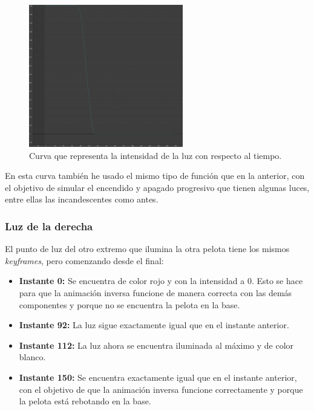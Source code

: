 \documentclass{article}
\begin{document}
 \begin{figure}[H]
    \centering
    \includegraphics[width=0.6\textwidth]{imagenes/curvas/LL/intensity.png}
    \caption{Curva que representa la intensidad de la luz con respecto al tiempo.}
 \end{figure}

 En esta curva también he usado el mismo tipo de función que en la anterior, con el objetivo de simular el encendido y apagado progresivo que tienen algunas luces, entre ellas las incandescentes como antes.

 \subsubsection{Luz de la derecha}

 El punto de luz del otro extremo que ilumina la otra pelota tiene los mismos \textit{keyframes}, pero comenzando desde el final:

 \begin{itemize}
    \item \textbf{Instante 0: }Se encuentra de color rojo y con la intensidad a 0. Esto se hace para que la animación inversa funcione de manera correcta con las demás componentes y porque no se encuentra la pelota en la base.
    \item \textbf{Instante 92: }La luz sigue exactamente igual que en el instante anterior.
    \item \textbf{Instante 112: }La luz ahora se encuentra iluminada al máximo y de color blanco.
    \item \textbf{Instante 150: }Se encuentra exactamente igual que en el instante anterior, con el objetivo de que la animación inversa funcione correctamente y porque la pelota está rebotando en la base.
 \end{itemize}
 
\end{document}
